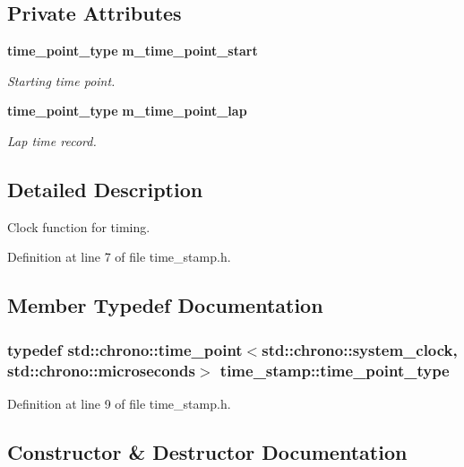 \subsection*{Private Attributes}
\begin{DoxyCompactItemize}
\item 
{\bf time\-\_\-point\-\_\-type} {\bf m\-\_\-time\-\_\-point\-\_\-start}
\begin{DoxyCompactList}\small\item\em Starting time point. \end{DoxyCompactList}\item 
{\bf time\-\_\-point\-\_\-type} {\bf m\-\_\-time\-\_\-point\-\_\-lap}
\begin{DoxyCompactList}\small\item\em Lap time record. \end{DoxyCompactList}\end{DoxyCompactItemize}


\subsection{Detailed Description}
Clock function for timing. 

Definition at line 7 of file time\-\_\-stamp.\-h.



\subsection{Member Typedef Documentation}
\subsubsection[{time\-\_\-point\-\_\-type}]{\setlength{\rightskip}{0pt plus 5cm}typedef std\-::chrono\-::time\-\_\-point$<$std\-::chrono\-::system\-\_\-clock, std\-::chrono\-::microseconds$>$ {\bf time\-\_\-stamp\-::time\-\_\-point\-\_\-type}}\label{d2/d9d/classtime__stamp_afe7f2c3cfd4ff4d4ca944eefe6aa4152}


Definition at line 9 of file time\-\_\-stamp.\-h.



\subsection{Constructor \& Destructor Documentation}
